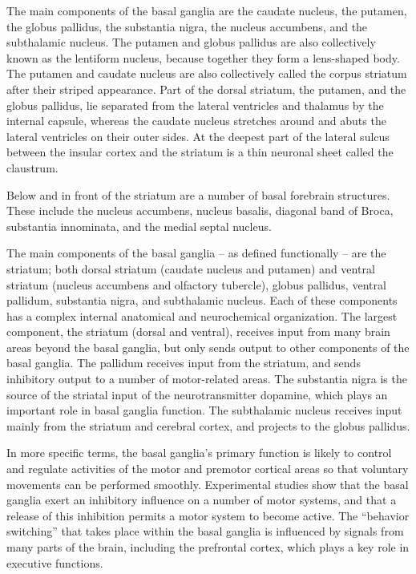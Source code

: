 The main components of the basal ganglia are the caudate nucleus, the putamen, the globus pallidus, the substantia nigra, the nucleus accumbens, and the subthalamic nucleus. The putamen and globus pallidus are also collectively known as the lentiform nucleus, because together they form a lens-shaped body. The putamen and caudate nucleus are also collectively called the corpus striatum after their striped appearance. Part of the dorsal striatum, the putamen, and the globus pallidus, lie separated from the lateral ventricles and thalamus by the internal capsule, whereas the caudate nucleus stretches around and abuts the lateral ventricles on their outer sides. At the deepest part of the lateral sulcus between the insular cortex and the striatum is a thin neuronal sheet called the claustrum.

Below and in front of the striatum are a number of basal forebrain structures. These include the nucleus accumbens, nucleus basalis, diagonal band of Broca, substantia innominata, and the medial septal nucleus.

The main components of the basal ganglia -- as defined functionally -- are the striatum; both dorsal striatum (caudate nucleus and putamen) and ventral striatum (nucleus accumbens and olfactory tubercle), globus pallidus, ventral pallidum, substantia nigra, and subthalamic nucleus. Each of these components has a complex internal anatomical and neurochemical organization. The largest component, the striatum (dorsal and ventral), receives input from many brain areas beyond the basal ganglia, but only sends output to other components of the basal ganglia. The pallidum receives input from the striatum, and sends inhibitory output to a number of motor-related areas. The substantia nigra is the source of the striatal input of the neurotransmitter dopamine, which plays an important role in basal ganglia function. The subthalamic nucleus receives input mainly from the striatum and cerebral cortex, and projects to the globus pallidus.

In more specific terms, the basal ganglia's primary function is likely to control and regulate activities of the motor and premotor cortical areas so that voluntary movements can be performed smoothly. Experimental studies show that the basal ganglia exert an inhibitory influence on a number of motor systems, and that a release of this inhibition permits a motor system to become active. The ``behavior switching'' that takes place within the basal ganglia is influenced by signals from many parts of the brain, including the prefrontal cortex, which plays a key role in executive functions.

